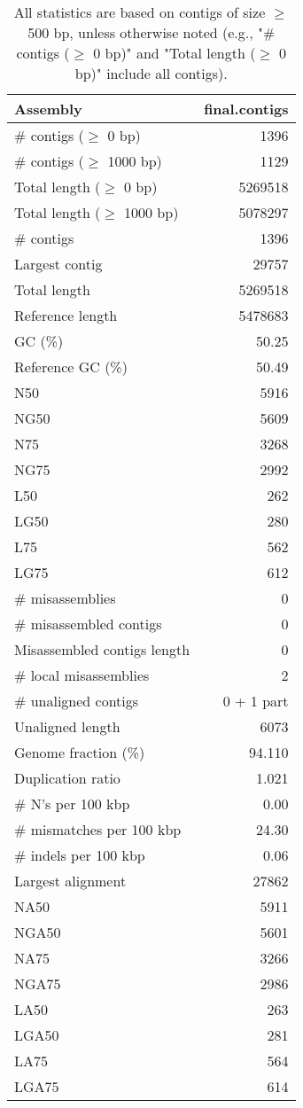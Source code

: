 \documentclass[12pt,a4paper]{article}
\begin{document}
\begin{table}[ht]
\begin{center}
\caption{All statistics are based on contigs of size $\geq$ 500 bp, unless otherwise noted (e.g., "\# contigs ($\geq$ 0 bp)" and "Total length ($\geq$ 0 bp)" include all contigs).}
\begin{tabular}{|l*{1}{|r}|}
\hline
Assembly & final.contigs \\ \hline
\# contigs ($\geq$ 0 bp) & 1396 \\ \hline
\# contigs ($\geq$ 1000 bp) & 1129 \\ \hline
Total length ($\geq$ 0 bp) & 5269518 \\ \hline
Total length ($\geq$ 1000 bp) & 5078297 \\ \hline
\# contigs & 1396 \\ \hline
Largest contig & 29757 \\ \hline
Total length & 5269518 \\ \hline
Reference length & 5478683 \\ \hline
GC (\%) & 50.25 \\ \hline
Reference GC (\%) & 50.49 \\ \hline
N50 & 5916 \\ \hline
NG50 & 5609 \\ \hline
N75 & 3268 \\ \hline
NG75 & 2992 \\ \hline
L50 & 262 \\ \hline
LG50 & 280 \\ \hline
L75 & 562 \\ \hline
LG75 & 612 \\ \hline
\# misassemblies & 0 \\ \hline
\# misassembled contigs & 0 \\ \hline
Misassembled contigs length & 0 \\ \hline
\# local misassemblies & 2 \\ \hline
\# unaligned contigs & 0 + 1 part \\ \hline
Unaligned length & 6073 \\ \hline
Genome fraction (\%) & 94.110 \\ \hline
Duplication ratio & 1.021 \\ \hline
\# N's per 100 kbp & 0.00 \\ \hline
\# mismatches per 100 kbp & 24.30 \\ \hline
\# indels per 100 kbp & 0.06 \\ \hline
Largest alignment & 27862 \\ \hline
NA50 & 5911 \\ \hline
NGA50 & 5601 \\ \hline
NA75 & 3266 \\ \hline
NGA75 & 2986 \\ \hline
LA50 & 263 \\ \hline
LGA50 & 281 \\ \hline
LA75 & 564 \\ \hline
LGA75 & 614 \\ \hline
\end{tabular}
\end{center}
\end{table}
\end{document}
